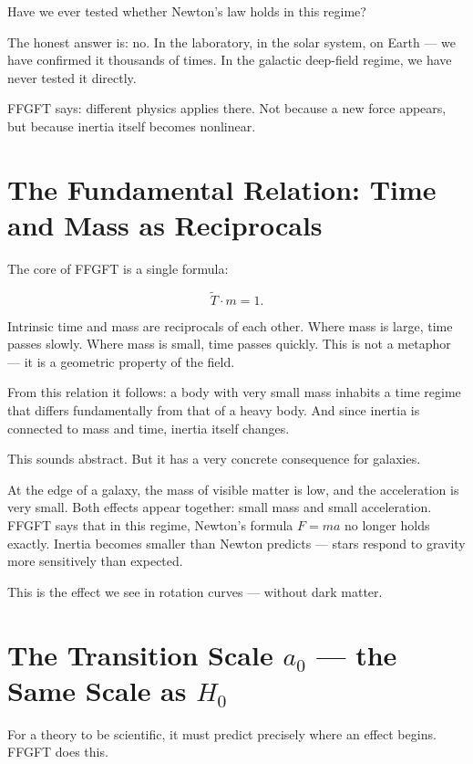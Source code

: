 \documentclass[11pt,oneside]{book}
\begin{document}
Have we ever tested whether Newton's law holds in this regime?

The honest answer is: no. In the laboratory, in the solar
system, on Earth — we have confirmed it thousands of times.
In the galactic deep-field regime, we have never tested it
directly.

FFGFT says: different physics applies there. Not because a
new force appears, but because inertia itself becomes
nonlinear.

\chapter{The Fundamental Relation: Time and Mass as Reciprocals}

The core of FFGFT is a single formula:

\[
  \tilde{T} \cdot m = 1 .
\]

Intrinsic time and mass are reciprocals of each other.
Where mass is large, time passes slowly. Where mass is
small, time passes quickly. This is not a metaphor — it is
a geometric property of the field.

From this relation it follows: a body with very small mass
inhabits a time regime that differs fundamentally from that
of a heavy body. And since inertia is connected to mass and
time, inertia itself changes.

This sounds abstract. But it has a very concrete consequence
for galaxies.

At the edge of a galaxy, the mass of visible matter is low,
and the acceleration is very small. Both effects appear
together: small mass and small acceleration. FFGFT says that
in this regime, Newton's formula $F = ma$ no longer holds
exactly. Inertia becomes smaller than Newton predicts —
stars respond to gravity more sensitively than expected.

This is the effect we see in rotation curves — without dark
matter.

\chapter{The Transition Scale $a_0$ — the Same Scale as $H_0$}

For a theory to be scientific, it must predict precisely
where an effect begins. FFGFT does this.
\end{document}
